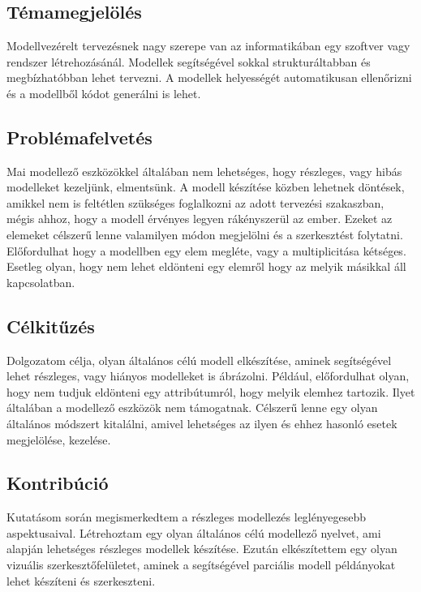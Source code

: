 \chapter{\bevezetes}

\section{Témamegjelölés}
Modellvezérelt tervezésnek nagy szerepe van az informatikában egy szoftver vagy rendszer létrehozásánál. Modellek segítségével sokkal strukturáltabban és megbízhatóbban lehet tervezni. A modellek helyességét automatikusan ellenőrizni és a modellből kódot generálni is lehet. 
\section{Problémafelvetés}
Mai modellező eszközökkel általában nem lehetséges, hogy részleges, vagy hibás modelleket kezeljünk, elmentsünk. A modell készítése közben lehetnek döntések, amikkel nem is feltétlen szükséges foglalkozni az adott tervezési szakaszban, mégis ahhoz, hogy a modell érvényes legyen rákényszerül az ember. Ezeket az elemeket célszerű lenne valamilyen módon megjelölni és a szerkesztést folytatni. Előfordulhat hogy a modellben egy elem megléte, vagy a multiplicitása kétséges. Esetleg olyan, hogy nem lehet eldönteni egy elemről hogy az melyik másikkal áll kapcsolatban.
\section{Célkitűzés}	
Dolgozatom célja, olyan általános célú modell elkészítése, aminek segítségével lehet részleges, vagy hiányos modelleket is ábrázolni. Például, előfordulhat olyan, hogy nem tudjuk eldönteni egy attribútumról, hogy melyik elemhez tartozik. Ilyet általában a modellező eszközök nem támogatnak. Célszerű lenne egy olyan általános módszert kitalálni, amivel lehetséges az ilyen és ehhez hasonló esetek megjelölése, kezelése.
\section{Kontribúció}
Kutatásom során megismerkedtem a részleges modellezés leglényegesebb aspektusaival. Létrehoztam egy olyan általános célú modellező nyelvet, ami alapján lehetséges részleges modellek készítése. Ezután elkészítettem egy olyan vizuális szerkesztőfelületet, aminek a segítségével parciális modell példányokat lehet készíteni és szerkeszteni.  

